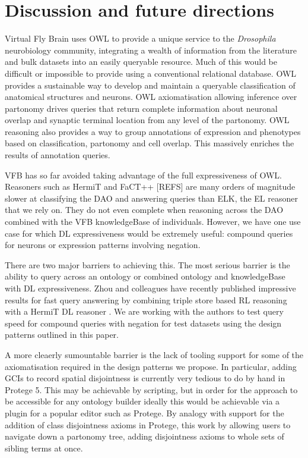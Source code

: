 \documentclass[runningheads,a4paper]{llncs}
\begin{document}
\section{Discussion and future directions}


Virtual Fly Brain uses OWL to provide a unique service to the
\textit{Drosophila} neurobiology community, integrating a wealth of
information from the literature and bulk datasets into an easily
queryable resource.  Much of this would be difficult or impossible to
provide using a conventional relational database. OWL
provides a sustainable way to develop and maintain a queryable
classification of anatomical structures and neurons.  OWL
axiomatisation allowing inference over partonomy drives queries that
 return complete information about neuronal overlap and synaptic
 terminal location from any level of the partonomy.  OWL reasoning
 also provides a way to group annotations of expression and phenotypes
 based on classification, partonomy and cell overlap.  This massively
 enriches the results of annotation queries.


VFB has so far avoided taking advantage of the full expressiveness of
OWL.  Reasoners such as HermiT and FaCT++ [REFS] are many orders of
magnitude slower at classifying the DAO and answering queries than
ELK, the EL reasoner that we rely on.  They do not even complete when
reasoning across the DAO combined with the VFB knowledgeBase of
individuals.  However, we have one use case for which DL
expressiveness would be extremely useful: compound queries for neurons
or expression patterns involving negation.

There are two major barriers to achieving this. The most serious
barrier is the ability to query across an ontology or combined ontology and
knowledgeBase with DL expressiveness.  Zhou and colleagues have
recently published impressive results for fast query answering by
combining triple store based RL reasoning with a HermiT DL reasoner
\cite{ZNCH14a}.  We are working with the authors to test query speed
for compound queries with negation for test datasets using the design
patterns outlined in this paper.

A more cleaerly sumountable barrier is the lack of tooling support for
some of the axiomatisation required in the design patterns we propose.  In
particular, adding GCIs to record spatial disjointness is currently
very tedious to do by hand in Protege 5.  This may be achievable by
scripting, but in order for the approach to be accessible for any
ontology builder ideally this would be achievable via a plugin for a
popular editor such as Protege.  By analogy with support for the
addition of class disjointness axioms in Protege, this work by allowing
users to navigate down a partonomy tree, adding disjointness axioms to
whole sets of sibling terms at once.
\end{document}
